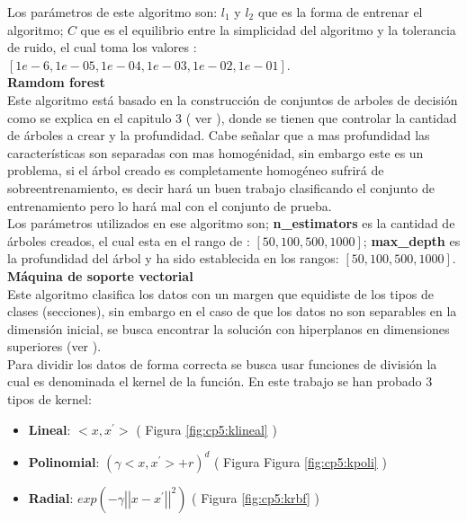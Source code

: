 Los parámetros de este algoritmo son: $l_1$ y $l_2$ que es la forma de entrenar el algoritmo; $C$ que es el equilibrio entre la simplicidad del algoritmo y la tolerancia de ruido, el cual toma los valores :$[1e-6, 1e-05, 1e-04, 1e-03, 1e-02, 1e-01]$.\\





\textbf{Ramdom forest}\\

Este algoritmo está basado en la construcción de conjuntos de arboles de decisión como se explica en el capitulo 3 ( ver  ), donde se tienen que controlar la cantidad de árboles a crear y la profundidad. Cabe señalar que a mas profundidad las características son separadas con mas homogénidad, sin embargo este es un problema, si el árbol creado es completamente homogéneo sufrirá de sobre\-entrenamiento, es decir hará un buen trabajo clasificando el conjunto de entrenamiento pero lo hará mal con el conjunto de prueba.\\

Los parámetros utilizados en ese algoritmo son; \textbf{n\_estimators} es la cantidad de árboles creados, el cual esta en el rango de : $[50, 100, 500, 1000]$; \textbf{max\_depth} es la profundidad del árbol y ha sido establecida en los rangos: $[50, 100, 500, 1000]$.\\

\textbf{Máquina de soporte vectorial}\\

Este algoritmo clasifica los datos con un margen que equidiste de los tipos de clases (secciones), sin embargo en el caso de que los datos no son separables en la dimensión inicial, se busca encontrar la solución con hiperplanos en dimensiones superiores (ver ).\\

Para dividir los datos de forma correcta se busca usar funciones de división la cual es denominada el kernel de la función. En este trabajo se han probado 3 tipos de kernel: 

\begin{itemize}

	\item \textbf{Lineal}: $<x,x^{'}>$ ( Figura \ref{fig:cp5:klineal} )

	\item \textbf{Polinomial}: $(\gamma <x,x^{'}>+r)^{d}$ ( Figura Figura \ref{fig:cp5:kpoli} )

	\item \textbf{Radial}: $exp(-\gamma {\left|\left| x-x^{'} \right|\right|}^2)$ ( Figura \ref{fig:cp5:krbf} )

\end{itemize}

